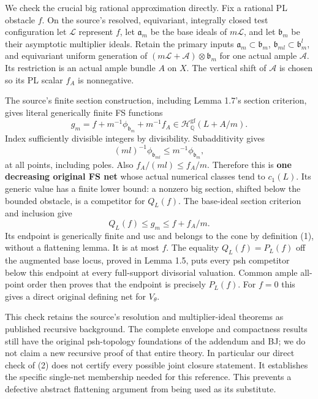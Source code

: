 \documentclass[
  10pt,
]{article}
\begin{document}
We check the crucial big rational approximation directly. Fix a rational
PL obstacle \(f\). On the source's resolved, equivariant, integrally
closed test configuration let \(\mathcal L\) represent \(f\), let
\(\mathfrak a_m\) be the base ideals of \(m\mathcal L\), and let
\(\mathfrak b_m\) be their asymptotic multiplier ideals. Retain the
primary inputs \(\mathfrak a_m\subset\mathfrak b_m\),
\(\mathfrak b_{ml}\subset\mathfrak b_m^l\), and equivariant uniform
generation of \((m\mathcal L+\mathcal A)\otimes\mathfrak b_m\) for one
actual ample \(\mathcal A\). Its restriction is an actual ample bundle
\(A\) on \(X\). The vertical shift of \(\mathcal A\) is chosen so its PL
scalar \(f_A\) is nonnegative.

The source's finite section construction, including Lemma 1.7's section
criterion, gives literal generically finite FS functions
\[g_m=f+m^{-1}\phi_{\mathfrak b_m}+m^{-1}f_A
       \in\mathcal H^{\mathrm{gf}}_{\mathbb Q}(L+A/m).                  \tag{2}\]
Index sufficiently divisible integers by divisibility. Subadditivity
gives
\[(ml)^{-1}\phi_{\mathfrak b_{ml}}\le m^{-1}\phi_{\mathfrak b_m},\] at
all points, including poles. Also \(f_A/(ml)\le f_A/m\). Therefore this
is \textbf{one decreasing original FS net} whose actual numerical
classes tend to \(c_1(L)\). Its generic value has a finite lower bound:
a nonzero big section, shifted below the bounded obstacle, is a
competitor for \(Q_L(f)\). The base-ideal section criterion and
inclusion give \[Q_L(f)\le g_m\le f+f_A/m.\] Its endpoint is generically
finite and usc and belongs to the cone by definition (1), without a
flattening lemma. It is at most \(f\). The equality \(Q_L(f)=P_L(f)\)
off the augmented base locus, proved in Lemma 1.5, puts every psh
competitor below this endpoint at every full-support divisorial
valuation. Common ample all-point order then proves that the endpoint is
precisely \(P_L(f)\). For \(f=0\) this gives a direct original defining
net for \(V_\theta\).

This check retains the source's resolution and multiplier-ideal theorems
as published recursive background. The complete envelope and compactness
results still have the original psh-topology foundations of the addendum
and BJ; we do not claim a new recursive proof of that entire theory. In
particular our direct check of (2) does not certify every possible joint
closure statement. It establishes the specific single-net membership
needed for this reference. This prevents a defective abstract flattening
argument from being used as its substitute.
\end{document}
